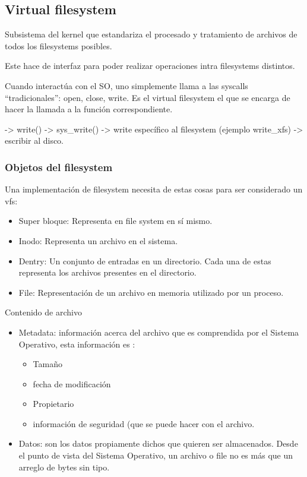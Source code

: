 \documentclass{article}
\begin{document}
\subsection{Virtual filesystem}\label{virtual-filesystem}

Subsistema del kernel que estandariza el procesado y tratamiento de
archivos de todos los filesystems posibles.

Este hace de interfaz para poder realizar operaciones intra filesystems
distintos.

Cuando interactúa con el SO, uno simplemente llama a las syscalls
``tradicionales'': open, close, write. Es el virtual filesystem el que
se encarga de hacer la llamada a la función correspondiente.

-\textgreater{} write() -\textgreater{} sys\_write() -\textgreater{}
write específico al filesystem (ejemplo write\_xfs) -\textgreater{}
escribir al disco.

\subsubsection{Objetos del filesystem}\label{objetos-del-filesystem}

Una implementación de filesystem necesita de estas cosas para ser
considerado un vfs:

\begin{itemize}
\item
  Super bloque: Representa en file system en sí mismo.
\item
  Inodo: Representa un archivo en el sistema.
\item
  Dentry: Un conjunto de entradas en un directorio. Cada una de estas
  representa los archivos presentes en el directorio.
\item
  File: Representación de un archivo en memoria utilizado por un
  proceso.
\end{itemize}

Contenido de archivo

\begin{itemize}
\item
  Metadata: información acerca del archivo que es comprendida por el
  Sistema Operativo, esta información es :

  \begin{itemize}
  \item
    Tamaño
  \item
    fecha de modificación
  \item
    Propietario
  \item
    información de seguridad (que se puede hacer con el archivo.
  \end{itemize}
\item
  Datos: son los datos propiamente dichos que quieren ser almacenados.
  Desde el punto de vista del Sistema Operativo, un archivo o file no es
  más que un arreglo de bytes sin tipo.
\end{itemize}
\end{document}
